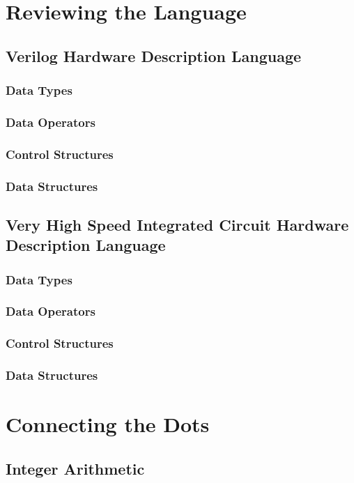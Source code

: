 \documentclass[a4paper,11pt]{book}
\begin{document}
\part{Reviewing the Language}
\label{PART:HDL}
\chapter[Verilog]{Verilog Hardware Description Language}
\section{Data Types}
\section{Data Operators}
\section{Control Structures}
\section{Data Structures}

\chapter[VHDL]{Very High Speed Integrated Circuit Hardware Description Language}
\section{Data Types}
\section{Data Operators}
\section{Control Structures}
\section{Data Structures}

\part{Connecting the Dots}
\label{PART:SYS}




\chapter{Integer Arithmetic}
\end{document}
